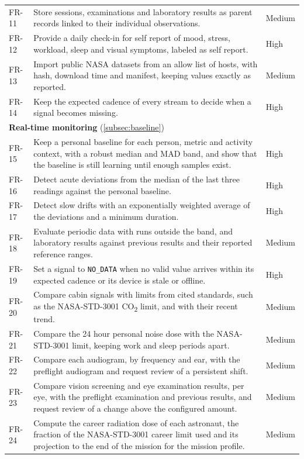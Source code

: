 {\begin{longtable}{p{1.5cm}p{10.8cm}p{1.5cm}}
FR-11 & Store sessions, examinations and laboratory results as parent records linked to their individual observations. & Medium \\
FR-12 & Provide a daily check-in for self report of mood, stress, workload, sleep and visual symptoms, labeled as self report. & High \\
FR-13 & Import public NASA datasets from an allow list of hosts, with hash, download time and manifest, keeping values exactly as reported. & Medium \\
FR-14 & Keep the expected cadence of every stream to decide when a signal becomes missing. & High \\
\multicolumn{3}{l}{\textbf{Real-time monitoring} (\ref{subsec:baseline})} \\
FR-15 & Keep a personal baseline for each person, metric and activity context, with a robust median and MAD band, and show that the baseline is still learning until enough samples exist. & High \\
FR-16 & Detect acute deviations from the median of the last three readings against the personal baseline. & High \\
FR-17 & Detect slow drifts with an exponentially weighted average of the deviations and a minimum duration. & High \\
FR-18 & Evaluate periodic data with runs outside the band, and laboratory results against previous results and their reported reference ranges. & Medium \\
FR-19 & Set a signal to \texttt{NO\_DATA} when no valid value arrives within its expected cadence or its device is stale or offline. & High \\
FR-20 & Compare cabin signals with limits from cited standards, such as the NASA-STD-3001 CO\textsubscript{2} limit, and with their recent trend. & Medium \\
FR-21 & Compare the 24 hour personal noise dose with the NASA-STD-3001 limit, keeping work and sleep periods apart. & Medium \\
FR-22 & Compare each audiogram, by frequency and ear, with the preflight audiogram and request review of a persistent shift. & Medium \\
FR-23 & Compare vision screening and eye examination results, per eye, with the preflight examination and previous results, and request review of a change above the configured amount. & Medium \\
FR-24 & Compute the career radiation dose of each astronaut, the fraction of the NASA-STD-3001 career limit used and its projection to the end of the mission for the mission profile. & Medium \\

\end{longtable}}
